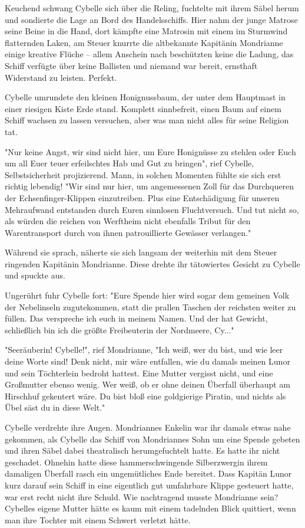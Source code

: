 Keuchend schwang Cybelle sich über die Reling, fuchtelte mit ihrem Säbel herum und sondierte die Lage an Bord des Handelsschiffs. Hier nahm der junge Matrose seine Beine in die Hand, dort kämpfte eine Matrosin mit einem im Sturmwind flatternden Laken, am Steuer knurrte die altbekannte Kapitänin Mondrianne einige kreative Flüche – allem Anschein nach beschützten keine  die Ladung, das Schiff verfügte über keine Ballisten und niemand war bereit, ernsthaft Widerstand zu leisten. Perfekt.

Cybelle umrundete den kleinen Honignussbaum, der unter dem Hauptmast in einer riesigen Kiste Erde stand. Komplett sinnbefreit, einen Baum auf einem Schiff wachsen zu lassen versuchen, aber was man nicht alles für seine Religion tat.

"Nur keine Angst, wir sind nicht hier, um Eure Honignüsse zu stehlen oder Euch um all Euer teuer erfeilschtes Hab und Gut zu bringen", rief Cybelle, Selbstsicherheit projizierend. Mann, in solchen Momenten fühlte sie sich erst richtig lebendig! "Wir sind nur hier, um angemessenen Zoll für das Durchqueren der Echsenfinger-Klippen einzutreiben. Plus eine Entschädigung für unseren Mehraufwand entstanden durch Euren sinnlosen Fluchtversuch. Und tut nicht so, als würden die reichen  von Werftheim nicht ebenfalls Tribut für den Warentransport durch von ihnen patrouillierte Gewässer verlangen."

Während sie sprach, näherte sie sich langsam der weiterhin mit dem Steuer ringenden Kapitänin Mondrianne. Diese drehte ihr tätowiertes Gesicht zu Cybelle und spuckte aus.

Ungerührt fuhr Cybelle fort: "Eure Spende hier wird sogar dem gemeinen Volk der Nebelinseln zugutekommen, statt die prallen Taschen der reichsten  weiter zu füllen. Das verspreche ich euch in meinem Namen. Und der hat Gewicht, schließlich bin ich die größte Freibeuterin der Nordmeere, Cy..."

"Seeräuberin! Cybelle!", rief Mondrianne, "Ich weiß, wer du bist, und wie leer deine Worte sind! Denk nicht, mir wäre entfallen, wie du damals meinen Lunor und sein Töchterlein bedroht hattest. Eine Mutter vergisst nicht, und eine Großmutter ebenso wenig. Wer weiß, ob er ohne deinen Überfall überhaupt am Hirschhuf gekentert wäre. Du bist bloß eine goldgierige Piratin, und nichts als Übel säst du in diese Welt."

Cybelle verdrehte ihre Augen. Mondriannes Enkelin war ihr damals etwas nahe gekommen, als Cybelle das Schiff von Mondriannes Sohn um eine Spende gebeten und ihren Säbel dabei theatralisch herumgefuchtelt hatte. Es hatte ihr nicht geschadet. Ohnehin hatte diese hammerschwingende Silberzwergin ihrem damaligen Überfall rasch ein ungemütliches Ende bereitet. Dass Kapitän Lunor kurz darauf sein Schiff in eine eigentlich gut umfahrbare Klippe gesteuert hatte, war erst recht nicht ihre Schuld. Wie nachtragend musste Mondrianne sein? Cybelles eigene Mutter hätte es kaum mit einem tadelnden Blick quittiert, wenn man ihre Tochter mit einem Schwert verletzt hätte.

